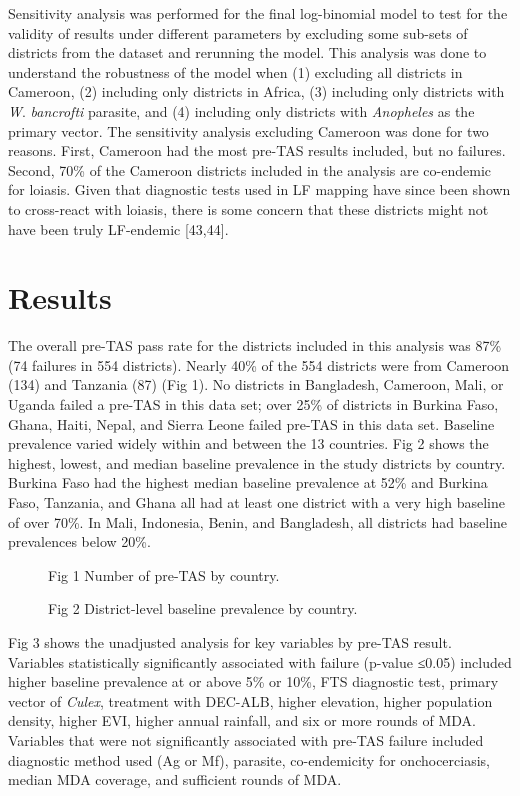 \documentclass[11pt,a4paper]{article}
\begin{document}
Sensitivity analysis was performed for the final log-binomial model to test for the validity of results under different parameters by excluding some sub-sets of districts from the dataset and rerunning the model. This analysis was done to understand the robustness of the model when (1) excluding all districts in Cameroon, (2) including only districts in Africa, (3) including only districts with \textit{W}. \textit{bancrofti} parasite, and (4) including only districts with \textit{Anopheles} as the primary vector. The sensitivity analysis excluding Cameroon was done for two reasons. First, Cameroon had the most pre-TAS results included, but no failures. Second, 70\% of the Cameroon districts included in the analysis are co-endemic for loiasis. Given that diagnostic tests used in LF mapping have since been shown to cross-react with loiasis, there is some concern that these districts might not have been truly LF-endemic [43,44].

\section{Results}

The overall pre-TAS pass rate for the districts included in this analysis was 87\% (74 failures in 554 districts). Nearly 40\% of the 554 districts were from Cameroon (134) and Tanzania (87) (Fig 1). No districts in Bangladesh, Cameroon, Mali, or Uganda failed a pre-TAS in this data set; over 25\% of districts in Burkina Faso, Ghana, Haiti, Nepal, and Sierra Leone failed pre-TAS in this data set. Baseline prevalence varied widely within and between the 13 countries. Fig 2 shows the highest, lowest, and median baseline prevalence in the study districts by country. Burkina Faso had the highest median baseline prevalence at 52\% and Burkina Faso, Tanzania, and Ghana all had at least one district with a very high baseline of over 70\%. In Mali, Indonesia, Benin, and Bangladesh, all districts had baseline prevalences below 20\%.

\begin{figure}[h]
\caption{Fig 1 Number of pre-TAS by country.}
\end{figure}

\begin{figure}[h]
\caption{Fig 2 District-level baseline prevalence by country.}
\end{figure}

Fig 3 shows the unadjusted analysis for key variables by pre-TAS result. Variables statistically significantly associated with failure (p-value ≤0.05) included higher baseline prevalence at or above 5\% or 10\%, FTS diagnostic test, primary vector of \textit{Culex}, treatment with DEC-ALB, higher elevation, higher population density, higher EVI, higher annual rainfall, and six or more rounds of MDA. Variables that were not significantly associated with pre-TAS failure included diagnostic method used (Ag or Mf), parasite, co-endemicity for onchocerciasis, median MDA coverage, and sufficient rounds of MDA.
\end{document}
